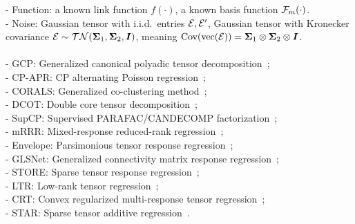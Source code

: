 \documentclass[12pt]{article}
\theoremstyle{definition}
\theoremstyle{definition}
\begin{document}
{{\begin{landscape}
\begin{table}[h!]
{- Function: a known link function $f(\cdot)$, a known basis function $\mathcal{F}_m(\cdot)$. \\
- Noise: Gaussian tensor with i.i.d.\ entries $\mathcal{E}, \mathcal{E}'$, Gaussian tensor with Kronecker covariance $\mathcal{E} \sim \mathcal{TN}(\bm \Sigma_1, \bm \Sigma_2, \bm I)$, meaning $\text{Cov}(\text{vec}(\mathcal{E}))=\bm \Sigma_1\otimes\bm \Sigma_2\otimes \bm I$.\\
\vspace{-0.1cm}\\
- GCP: Generalized canonical polyadic tensor decomposition~\citep{hong2020generalized};\\
- CP-APR: CP alternating Poisson regression~\citep{chi2012tensors};\\
- CORALS: Generalized co-clustering method~\citep{li2020generalized};\\
- DCOT: Double core tensor decomposition~\citep{tarzanagh2019regularized};\\
- SupCP: Supervised PARAFAC/CANDECOMP factorization~\citep{lock2018supervised};\\
- mRRR: Mixed-response reduced-rank regression~\citep{luo2018leveraging};\\
- Envelope: Parsimonious tensor response regression~\citep{li2017parsimonious};\\
- GLSNet: Generalized connectivity matrix response regression~\citep{zhang2018network};\\
- STORE: Sparse tensor response regression~\citep{sun2017store};\\
- LTR: Low-rank tensor regression~\citep{han2020optimal};\\
- CRT: Convex regularized multi-response tensor regression~\citep{raskutti2019convex};\\
- STAR: Sparse tensor additive regression~\citep{hao2019sparse}.
}\label{table:comp_table}
\end{table}
\end{landscape}
}
}
\end{document}
